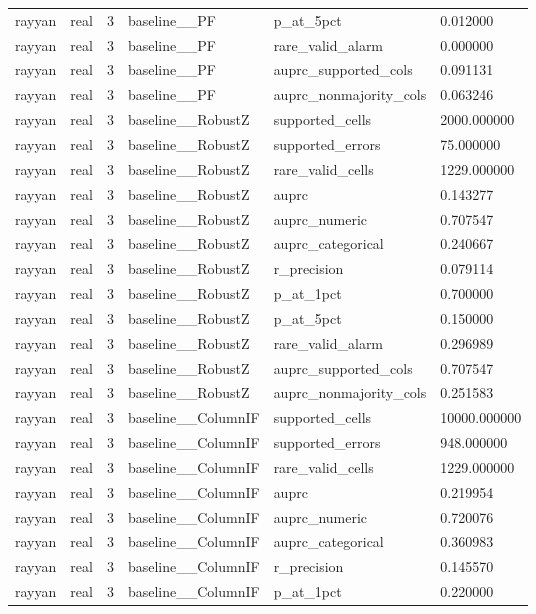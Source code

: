 \begin{tabular}{llllll}
rayyan & real & 3 & baseline\_\_PF & p\_at\_5pct & 0.012000 \\
rayyan & real & 3 & baseline\_\_PF & rare\_valid\_alarm & 0.000000 \\
rayyan & real & 3 & baseline\_\_PF & auprc\_supported\_cols & 0.091131 \\
rayyan & real & 3 & baseline\_\_PF & auprc\_nonmajority\_cols & 0.063246 \\
rayyan & real & 3 & baseline\_\_RobustZ & supported\_cells & 2000.000000 \\
rayyan & real & 3 & baseline\_\_RobustZ & supported\_errors & 75.000000 \\
rayyan & real & 3 & baseline\_\_RobustZ & rare\_valid\_cells & 1229.000000 \\
rayyan & real & 3 & baseline\_\_RobustZ & auprc & 0.143277 \\
rayyan & real & 3 & baseline\_\_RobustZ & auprc\_numeric & 0.707547 \\
rayyan & real & 3 & baseline\_\_RobustZ & auprc\_categorical & 0.240667 \\
rayyan & real & 3 & baseline\_\_RobustZ & r\_precision & 0.079114 \\
rayyan & real & 3 & baseline\_\_RobustZ & p\_at\_1pct & 0.700000 \\
rayyan & real & 3 & baseline\_\_RobustZ & p\_at\_5pct & 0.150000 \\
rayyan & real & 3 & baseline\_\_RobustZ & rare\_valid\_alarm & 0.296989 \\
rayyan & real & 3 & baseline\_\_RobustZ & auprc\_supported\_cols & 0.707547 \\
rayyan & real & 3 & baseline\_\_RobustZ & auprc\_nonmajority\_cols & 0.251583 \\
rayyan & real & 3 & baseline\_\_ColumnIF & supported\_cells & 10000.000000 \\
rayyan & real & 3 & baseline\_\_ColumnIF & supported\_errors & 948.000000 \\
rayyan & real & 3 & baseline\_\_ColumnIF & rare\_valid\_cells & 1229.000000 \\
rayyan & real & 3 & baseline\_\_ColumnIF & auprc & 0.219954 \\
rayyan & real & 3 & baseline\_\_ColumnIF & auprc\_numeric & 0.720076 \\
rayyan & real & 3 & baseline\_\_ColumnIF & auprc\_categorical & 0.360983 \\
rayyan & real & 3 & baseline\_\_ColumnIF & r\_precision & 0.145570 \\
rayyan & real & 3 & baseline\_\_ColumnIF & p\_at\_1pct & 0.220000 \\

\end{tabular}

